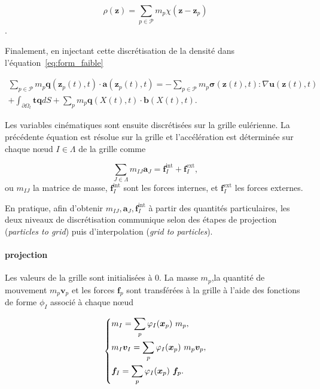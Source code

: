 \begin{equation*}
    \rho(\bm z) = \sum_{p \in \mathcal P} m_p \chi(\bm z - \bm z_p)
\end{equation*}.

Finalement, en injectant cette discrétisation de la densité dans l'équation~\eqref{eq:form_faible}

\begin{multline*}
    \sum_{p \in \mathcal P} m_p \bm q(\bm z_p(t), t)\cdot \bm a(\bm z_p(t), t) = - \sum_{p \in \mathcal P} m_p \bm \sigma(\bm z(t), t) : \nabla \bm u(\bm z(t), t) \\
    + \int_{\partial \Omega_t} \bm t \bm q dS + \sum_{p} m_p \bm q(X(t), t) \cdot \bm b(X(t), t).
\end{multline*}

Les variables cinématiques sont ensuite discrétisées sur la grille eulérienne. La précédente équation est résolue sur la grille et l'accélération est déterminée sur chaque nœud $I \in \Lambda$ de la grille comme

\begin{equation*}\label{eq:mpm_pfd}
    \sum_{J \in \Lambda} m_{IJ} \bm a_J = \bm f_I^{\text{int}} + \bm f_I^{\text{ext}},
\end{equation*}ou $m_{IJ}$ la matrice de masse, $\bm f_I^{\text{int}}$ sont les forces internes, et $\bm f_I^{\text{ext}}$ les forces externes.

En pratique, afin d'obtenir $m_{IJ},\bm a_J,\bm f_I^{\text{int}}$ à partir des quantités particulaires, les deux niveaux de discrétisation communique selon des étapes de projection (\textit{particles to grid}) puis d'interpolation (\textit{grid to particles}).

\paragraph*{projection}

Les valeurs de la grille sont initialisées à 0. La masse $m_p$,la quantité de mouvement $m_p \bm v_p$ et les forces $\bm f_p$ sont transférées à la grille à l'aide des fonctions de forme $\phi_I$ associé à chaque nœud

\begin{gather*}
    \left\{\begin{aligned}
         & m_I = \sum_p \varphi_{I}(\bm{x}_p)~ m_p,                   \\
         & m_I \bm v_I  =  \sum_p \varphi_{I}(\bm{x}_p)~ m_p \bm v_p, \\
         & \bm f_I  =  \sum_p \varphi_{I}(\bm{x}_p)~\bm f_p.
    \end{aligned} \right.
\end{gather*}

